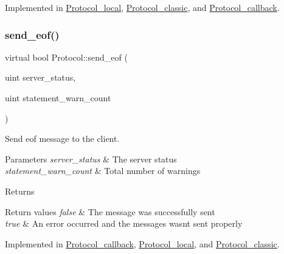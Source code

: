 Implemented in \mbox{\hyperlink{classProtocol__local_a81ecc940d6b680cc855a5c34012686c6}{Protocol\+\_\+local}}, \mbox{\hyperlink{classProtocol__classic_afabebba2b775725054454c1cbe2e3721}{Protocol\+\_\+classic}}, and \mbox{\hyperlink{classProtocol__callback_a42c79ab20047c154ff73d8d732563928}{Protocol\+\_\+callback}}.

\mbox{\label{classProtocol_a9a2cc208a15a3a81f99ace4c1009c01d}} 
\subsubsection{\texorpdfstring{send\+\_\+eof()}{send\_eof()}}
{\footnotesize\ttfamily virtual bool Protocol\+::send\+\_\+eof (\begin{DoxyParamCaption}\item[{uint}]{server\+\_\+status,  }\item[{uint}]{statement\+\_\+warn\+\_\+count }\end{DoxyParamCaption})\hspace{0.3cm}{\ttfamily [pure virtual]}}

Send eof message to the client.


\begin{DoxyParams}{Parameters}
{\em server\+\_\+status} & The server status \\
\hline
{\em statement\+\_\+warn\+\_\+count} & Total number of warnings\\
\hline
\end{DoxyParams}
\begin{DoxyReturn}{Returns}

\end{DoxyReturn}

\begin{DoxyRetVals}{Return values}
{\em false} & The message was successfully sent \\
\hline
{\em true} & An error occurred and the messages wasn\textquotesingle{}t sent properly \\
\hline
\end{DoxyRetVals}


Implemented in \mbox{\hyperlink{classProtocol__callback_a67fbe75c90e0c993d5e3e15455fbeb99}{Protocol\+\_\+callback}}, \mbox{\hyperlink{classProtocol__local_a1aad5312e410648afe13f0ba3d252e36}{Protocol\+\_\+local}}, and \mbox{\hyperlink{classProtocol__classic_a73b13a1041c96721d6ea08b5fa0eaf50}{Protocol\+\_\+classic}}.

